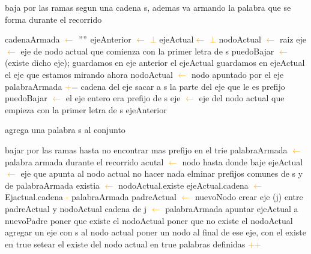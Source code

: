 \begin{algorithm}
\caption{baja por las ramas segun una cadena s, ademas va armando la palabra que se forma durante el recorrido }
\begin{algorithmic}[1]
\STATE cadenaArmada \textcolor{orange}{$\leftarrow$}  $""$
\STATE ejeAnterior \textcolor{orange}{$\leftarrow$}  \textcolor{orange}{$\bot$}
\STATE ejeActual\textcolor{orange}{$\leftarrow$}  \textcolor{orange}{$\bot$}
\STATE nodoActual \textcolor{orange}{$\leftarrow$} raiz
\STATE eje \textcolor{orange}{$\leftarrow$} eje de nodo actual que comienza con la primer letra de s
\STATE puedoBajar \textcolor{orange}{$\leftarrow$} (existe dicho eje);
	\STATE guardamos en eje anterior el ejeActual
	\STATE guardamos en ejeActual el eje que estamos mirando ahora 
	\STATE nodoActual \textcolor{orange}{$\leftarrow$} nodo apuntado por el eje
	\STATE palabraArmada \textcolor{orange}{+=} cadena del eje
	\STATE sacar a s la parte del eje que le es prefijo
	\STATE puedoBajar \textcolor{orange}{$\leftarrow$} el eje entero era prefijo de s
	\STATE eje \textcolor{orange}{$\leftarrow$} eje del nodo actual que empieza con la primer letra de s
\ENDWHILE
\RETURN ejeAnterior
\label{alg:bajar}
\end{algorithmic}
\end{algorithm}	

\begin{algorithm}
\caption{agrega una palabra s al conjunto}
\begin{algorithmic}[1]
\STATE bajar por las ramas hasta no encontrar mas prefijo en el trie
\STATE palabraArmada \textcolor{orange}{$\leftarrow$} palabra armada durante el recorrido
\STATE acutal \textcolor{orange}{$\leftarrow$} nodo hasta donde baje
\STATE ejeActual \textcolor{orange}{$\leftarrow$} eje que apunta al nodo actual
	\STATE no hacer nada
\ELSE
	\STATE elminar prefijos comunes de s y de palabraArmada
		\STATE {} 
		\STATE existia \textcolor{orange}{$\leftarrow$} nodoActual.existe
		\STATE ejeActual.cadena \textcolor{orange}{$\leftarrow$} Ejactual.cadena \textcolor{orange}{-} palabraArmada  
		\STATE padreActual \textcolor{orange}{$\leftarrow$} nuevoNodo 
		\STATE crear eje (j) entre padreActual y nodoActual
		\STATE cadena de j \textcolor{orange}{$\leftarrow$} palabraArmada
		\STATE apuntar ejeActual a nuevoPadre 
			\STATE poner que existe el nodoActual
		\ELSE
			\STATE poner que no existe el nodoActual
		\ENDIF
\ENDIF
\ENDIF
		\STATE agregar un eje con s al nodo actual
		\STATE poner un nodo al final de ese eje, con el existe en true
	\ELSE
		\STATE setear el existe del nodo actual en true
	\ENDIF
\STATE palabras definidas \textcolor{orange}{++}
\end{algorithmic}
\end{algorithm}

